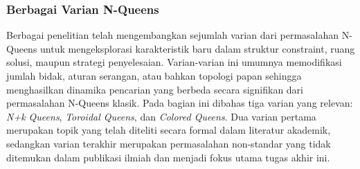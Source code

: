 \documentclass[a4paper,twoside]{article}
\begin{document}
	\subsubsection{Berbagai Varian N-Queens}
	
	Berbagai penelitian telah mengembangkan sejumlah varian dari permasalahan N-Queens untuk mengeksplorasi karakteristik baru dalam struktur constraint, ruang solusi, maupun strategi penyelesaian. Varian-varian ini umumnya memodifikasi jumlah bidak, aturan serangan, atau bahkan topologi papan sehingga menghasilkan dinamika pencarian yang berbeda secara signifikan dari permasalahan N-Queens klasik. Pada bagian ini dibahas tiga varian yang relevan: \textit{N+k Queens}, \textit{Toroidal Queens}, dan \textit{Colored Queens}. Dua varian pertama merupakan topik yang telah diteliti secara formal dalam literatur akademik, sedangkan varian terakhir merupakan permasalahan non-standar yang tidak ditemukan dalam publikasi ilmiah dan menjadi fokus utama tugas akhir ini.
	
\end{document}
